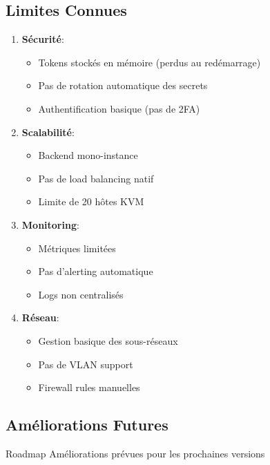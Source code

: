 \documentclass[12pt,a4paper]{article}
\begin{document}
\subsection{Limites Connues}

\begin{enumerate}
    \item \textbf{Sécurité}:
    \begin{itemize}
        \item Tokens stockés en mémoire (perdus au redémarrage)
        \item Pas de rotation automatique des secrets
        \item Authentification basique (pas de 2FA)
    \end{itemize}
    
    \item \textbf{Scalabilité}:
    \begin{itemize}
        \item Backend mono-instance
        \item Pas de load balancing natif
        \item Limite de 20 hôtes KVM
    \end{itemize}
    
    \item \textbf{Monitoring}:
    \begin{itemize}
        \item Métriques limitées
        \item Pas d'alerting automatique
        \item Logs non centralisés
    \end{itemize}
    
    \item \textbf{Réseau}:
    \begin{itemize}
        \item Gestion basique des sous-réseaux
        \item Pas de VLAN support
        \item Firewall rules manuelles
    \end{itemize}
\end{enumerate}

\subsection{Améliorations Futures}

\begin{successbox}{Roadmap}
Améliorations prévues pour les prochaines versions
\end{successbox}
\end{document}
